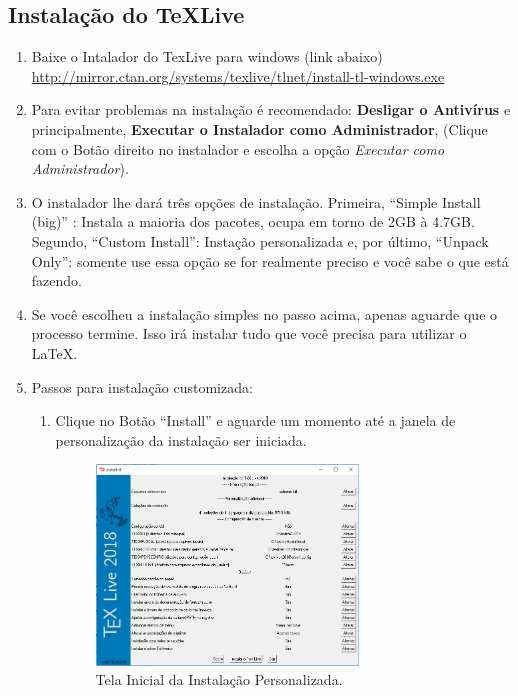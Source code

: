 \subsection*{Instalação do TeXLive}
\begin{enumerate}
	\item	Baixe o Intalador do TexLive para windows (link abaixo)\\
	      \href{http://mirror.ctan.org/systems/texlive/tlnet/install-tl-windows.exe}{http://mirror.ctan.org/systems/texlive/tlnet/install-tl-windows.exe}

	\item Para evitar problemas na instalação é recomendado: \textbf{Desligar o Antivírus} e principalmente, \textbf{Executar o Instalador como Administrador}, (Clique com o Botão direito no instalador e escolha a opção \textit{Executar como Administrador}).

	\item O instalador lhe dará três opções de instalação. Primeira, ``Simple Install (big)'' : Instala a maioria dos pacotes, ocupa em torno de 2GB à 4.7GB. Segundo, ``Custom Install'': Instação personalizada e, por último, ``Unpack Only'': somente use essa opção se for realmente preciso e você sabe o que está fazendo.
	\item Se você escolheu a instalação simples no passo acima, apenas aguarde que o processo termine. Isso irá instalar tudo que você precisa para utilizar o \LaTeX.
	\item Passos para instalação customizada:
	      \begin{enumerate}
		      \item Clique no Botão ``Install'' e aguarde um momento até a janela de personalização da instalação ser iniciada. \\
		            \begin{figure}[htbp!]
			            \centering
			            \includegraphics[width=0.7\textwidth]{install-tl-01}
			            \caption[Instação Personalizaa]{Tela Inicial da Instalação Personalizada.}
			            \label{fig:install-tl-01}
                    \end{figure}


\end{enumerate}
\end{enumerate}
